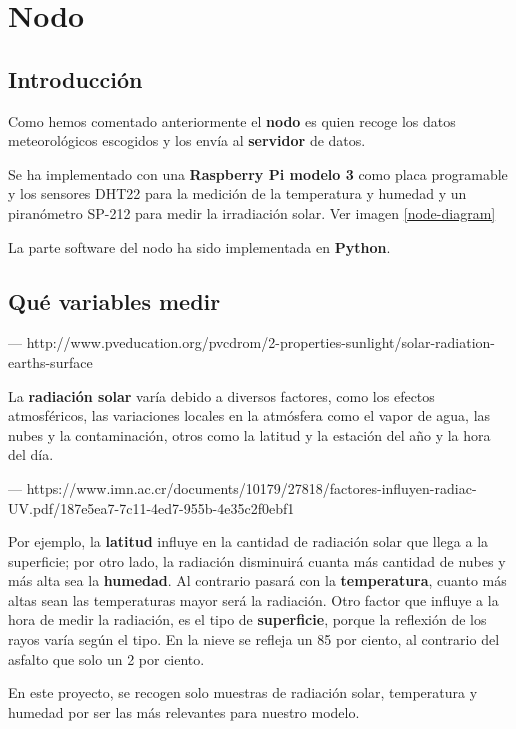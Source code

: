 \cleardoublepage

\chapter{Nodo}
\label{makereference4}

\section{Introducción}
\label{makereference4.1}
Como hemos comentado anteriormente el \textbf{nodo} es quien recoge los datos meteorológicos escogidos y los envía al \textbf{servidor} de datos.

Se ha implementado con una \textbf{Raspberry Pi modelo 3} como placa programable y los sensores DHT22 para la medición de la temperatura y humedad y un piranómetro SP-212 para medir la irradiación solar. Ver imagen \ref{node-diagram}

La parte software del nodo ha sido implementada en \textbf{Python}.

\section{Qué variables medir}
--- http://www.pveducation.org/pvcdrom/2-properties-sunlight/solar-radiation-earths-surface

La \textbf{radiación solar} varía debido a diversos factores, como los efectos atmosféricos, las variaciones locales en la atmósfera como el vapor de agua, las nubes y la contaminación, otros como la latitud y la estación del año y la hora del día.

--- https://www.imn.ac.cr/documents/10179/27818/factores-influyen-radiac-UV.pdf/187e5ea7-7c11-4ed7-955b-4e35c2f0ebf1

Por ejemplo, la \textbf{latitud} influye en la cantidad de radiación solar que llega a la superficie; por otro lado, la radiación disminuirá cuanta más cantidad de nubes y más alta sea la \textbf{humedad}. Al contrario pasará con la \textbf{temperatura}, cuanto más altas sean las temperaturas mayor será la radiación. Otro factor que influye a la hora de medir la radiación, es el tipo de \textbf{superficie}, porque la reflexión de los rayos varía según el tipo. En la nieve se refleja un 85 por ciento, al contrario del asfalto que solo un 2 por ciento.

En este proyecto, se recogen solo muestras de radiación solar, temperatura y humedad por ser las más relevantes para nuestro modelo.

